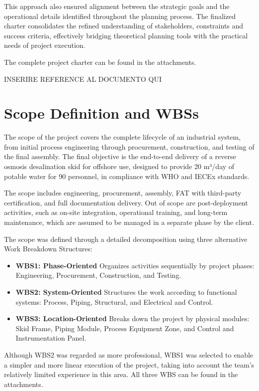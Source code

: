 \documentclass[12pt]{article}
\begin{document}
This approach also ensured alignment between the strategic goals and the operational details identified throughout the planning process. The finalized charter consolidates the refined understanding of stakeholders, constraints and success criteria, effectively bridging theoretical planning tools with the practical needs of project execution.

The complete project charter can be found in the attachments.

INSERIRE REFERENCE AL DOCUMENTO QUI

\section{Scope Definition and WBSs}

The scope of the project covers the complete lifecycle of an industrial system, from initial process engineering through procurement, construction, and testing of the final assembly.
The final objective is the end-to-end delivery of a reverse osmosis desalination skid for offshore use, designed to provide 20 m³/day of potable water for 90 personnel, in compliance with WHO and IECEx standards.

The scope includes engineering, procurement, assembly, FAT with third-party certification, and full documentation delivery.
Out of scope are post-deployment activities, such as on-site integration, operational training, and long-term maintenance, which are assumed to be managed in a separate phase by the client.

The scope was defined through a detailed decomposition using three alternative Work Breakdown Structures:
\begin{itemize}
        \item \textbf{WBS1: Phase-Oriented}
              Organizes activities sequentially by project phases: Engineering, Procurement, Construction, and Testing.
        \item \textbf{WBS2: System-Oriented}
              Structures the work according to functional systems: Process, Piping, Structural, and Electrical and Control.
        \item \textbf{WBS3: Location-Oriented}
              Breaks down the project by physical modules: Skid Frame, Piping Module, Process Equipment Zone, and Control and Instrumentation Panel.
\end{itemize}
Although WBS2 was regarded as more professional, WBS1 was selected to enable a simpler and more linear execution of the project, taking into account the team’s relatively limited experience in this area.
All three WBS can be found in the attachments.
\end{document}
